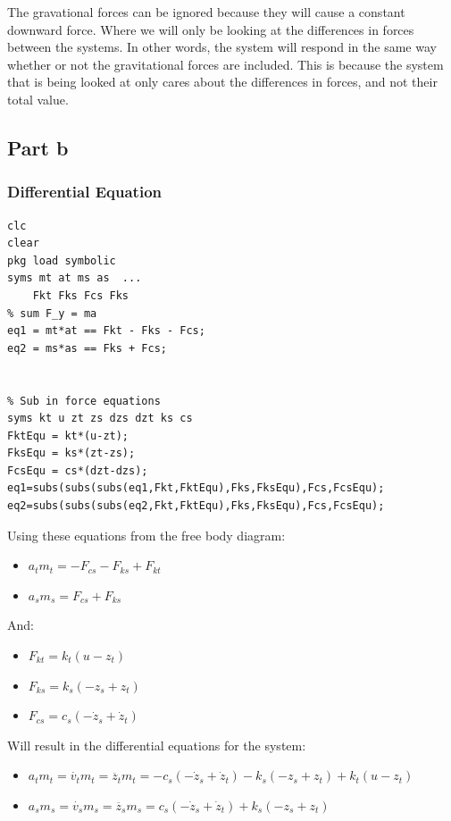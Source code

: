 \documentclass[11pt]{article}
\begin{document}
The gravational forces can be ignored because they will cause a constant downward force. Where we will only be looking at the differences in forces between the systems. In other words, the system will respond in the same way whether or not the gravitational forces are included. This is because the system that is being looked at only cares about the differences in forces, and not their total value.
\subsection{Part b}
\label{sec:orgb61511b}
\subsubsection{Differential Equation}
\label{sec:orgfba282b}
\begin{verbatim}
clc
clear
pkg load symbolic
syms mt at ms as  ...
    Fkt Fks Fcs Fks
% sum F_y = ma
eq1 = mt*at == Fkt - Fks - Fcs;
eq2 = ms*as == Fks + Fcs;


% Sub in force equations
syms kt u zt zs dzs dzt ks cs
FktEqu = kt*(u-zt);
FksEqu = ks*(zt-zs);
FcsEqu = cs*(dzt-dzs);
eq1=subs(subs(subs(eq1,Fkt,FktEqu),Fks,FksEqu),Fcs,FcsEqu);
eq2=subs(subs(subs(eq2,Fkt,FktEqu),Fks,FksEqu),Fcs,FcsEqu);
\end{verbatim}



Using these equations from the free body diagram:
\begin{itemize}
\item \(a_t m_t = - F_{cs} - F_{ks} + F_{kt}\)
\item \(a_s m_s = F_{cs} + F_{ks}\)
\end{itemize}
And:
\begin{itemize}
\item \(F_{kt} = k_t \left(u - z_t\right)\)
\item \(F_{ks} = k_s \left(- z_s + z_t\right)\)
\item \(F_{cs} = c_s \left(- \dot{z}_s + \dot{z}_t\right)\)
\end{itemize}
Will result in the differential equations for the system:
\begin{itemize}
\item \(a_t m_t = \dot{v_t} m_t = \ddot{z_t} m_t = -c_s \left(- \dot{z}_s + \dot{z}_t\right) - k_s \left(- z_s + z_t\right) + k_t \left(u - z_t\right)\)
\item \(a_s m_s = \dot{v_s} m_s = \ddot{z_s} m_s =  c_s \left(- \dot{z}_s + \dot{z}_t\right) + k_s \left(- z_s + z_t\right)\)
\end{itemize}
\end{document}
